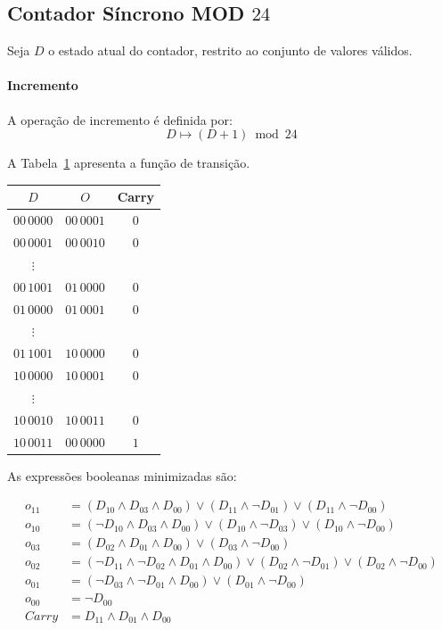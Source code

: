 \subsection{Contador Síncrono MOD $24$}

Seja $D$ o estado atual do contador, restrito ao conjunto de valores válidos.

\paragraph{Incremento}
A operação de incremento é definida por:
\[
D \mapsto (D + 1) \bmod 24
\]

A Tabela~\ref{tab:inc_mod24} apresenta a função de transição.

\begin{table} [H] \label{tab:inc_mod24}
\begin{center}
\begin{tabular}{c|cc}
    $D$ & $O$ & Carry \\
    \hline
    $00\,0000$ & $00\,0001$ & $0$ \\
    $00\,0001$ & $00\,0010$ & $0$ \\
    $\vdots$ &  &  \\
    $00\,1001$ & $01\,0000$ & $0$ \\
    $01\,0000$ & $01\,0001$ & $0$ \\
    $\vdots$ &  &  \\
    $01\,1001$ & $10\,0000$ & $0$ \\
    $10\,0000$ & $10\,0001$ & $0$ \\
    $\vdots$ &  &  \\
    $10\,0010$ & $10\,0011$ & $0$ \\
    $10\,0011$ & $00\,0000$ & $1$ \\
\end{tabular}
\end{center}
\end{table}

As expressões booleanas minimizadas são:

\begin{align*}
    o_{11} &= (D_{10} \land D_{03} \land D_{00}) \lor (D_{11} \land \lnot D_{01}) \lor (D_{11} \land \lnot D_{00}) \\[4pt]
    o_{10} &= (\lnot D_{10} \land D_{03} \land D_{00}) \lor (D_{10} \land \lnot D_{03}) \lor (D_{10} \land \lnot D_{00}) \\[4pt]
    o_{03} &= (D_{02} \land D_{01} \land D_{00}) \lor (D_{03} \land \lnot D_{00}) \\[4pt]
    o_{02} &= (\lnot D_{11} \land \lnot D_{02} \land D_{01} \land D_{00}) \lor (D_{02} \land \lnot D_{01}) \lor (D_{02} \land \lnot D_{00}) \\[4pt]
    o_{01} &= (\lnot D_{03} \land \lnot D_{01} \land D_{00}) \lor (D_{01} \land \lnot D_{00}) \\[4pt]
    o_{00} &= \lnot D_{00} \\[4pt]
    Carry &= D_{11} \land D_{01} \land D_{00}
\end{align*}

